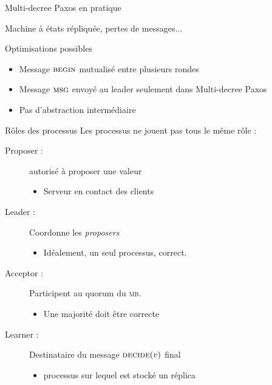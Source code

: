 
\begingroup

\begin{frame}{Multi-decree Paxos en pratique}

  Machine à états répliquée, pertes de messages...

  \begin{block}{Optimisations possibles}
    \begin{itemize}
    \item Message $\textsc{begin}$ mutualisé entre plusieurs rondes
    \item Message $\textsc{msg}$ envoyé au leader seulement dans Multi-decree Paxos
    \item Pas d'abstraction intermédiaire
    \end{itemize}
  \end{block}

  \begin{block}{Rôles des processus}
    Les processus ne jouent pas tous le même rôle :
    \begin{description}
    \item[Proposer :] autorisé à proposer une valeur
      \begin{itemize}
      \item \vspace{-1mm} Serveur en contact des clients
      \end{itemize}
    \item[Leader :] Coordonne les \emph{proposers}
      \begin{itemize}
      \item \vspace{-1mm} Idéalement, un seul processus, correct. 
      \end{itemize}
    \item[Acceptor :] Participent au quorum du \textsc{mb}.\Broadcast
      \begin{itemize}
      \item \vspace{-1mm} Une majorité doit être correcte
      \end{itemize}
    \item[Learner :] Destinataire du message $\textsc{decide}(v)$ final
      \begin{itemize}
      \item \vspace{-1mm} processus sur lequel est stocké un réplica
      \end{itemize}
    \end{description}
  \end{block}

\end{frame}

\endgroup
\endinput
